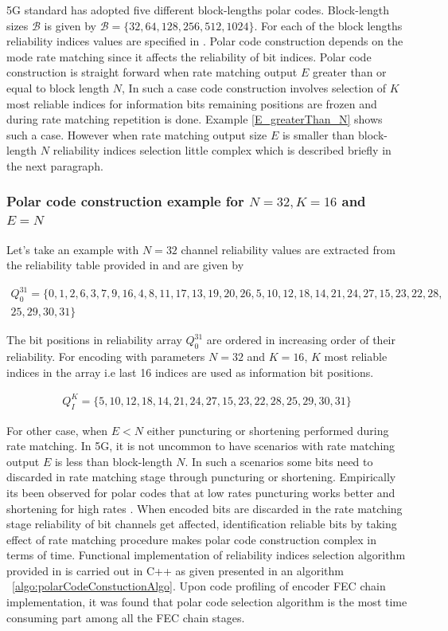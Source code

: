 5G standard has adopted five different block-lengths polar codes. Block-length sizes $\mathcal{B}$ is given by $\mathcal{B} = \{32,64,128,256,512,1024\}$.
For each of the block lengths reliability indices values are specified in \cite{3gpp.38.212}. Polar code construction depends on the mode rate matching since it affects the reliability of bit indices. Polar code construction is straight forward when rate matching output $E$ greater than or equal to block length $N$, In such a case code construction involves selection of $K$ most reliable indices for information bits remaining positions are frozen and during rate matching repetition is done. Example  \ref{E_greaterThan_N} shows such a case. However when rate matching output size $E$ is smaller than block-length $N$ reliability indices selection little complex which is described briefly in the next paragraph.

\subsubsection*{Polar code construction example for $N = 32, K = 16$ and $E = N$} \label{E_greaterThan_N}
Let's take an example with $N = 32$ channel reliability values are extracted from the reliability table provided in \cite{3gpp.38.212} and are given by

\begin{eqnarray*}
Q_{0}^{31} = \{ 0, 1, 2, 6, 3, 7, 9, 16,4, 8, 11, 17, 13, 19, 20, 26, 5, 10, 12, 18, 14, 21, 24, 27, 15, 23, 22, 28,\\
25, 29, 30, 31 \}
\end{eqnarray*}

The bit positions in reliability array $Q_{0}^{31}$ are ordered in increasing order of their reliability. For encoding with parameters $N = 32$ and $K = 16$, $K$ most reliable indices in the array i.e last 16 indices are used as information bit positions. 

\begin{eqnarray*}
	Q_{\textit{I}}^{\textit{K}} =  \{5, 10, 12, 18, 14, 21, 24, 27, 15, 23, 22, 28,25, 29, 30, 31 \}
\end{eqnarray*} 

For other case, when $E < N$ either puncturing or shortening performed during rate matching. In 5G, it is not uncommon to have scenarios with rate matching output $E$ is less than block-length $N$. In such a scenarios some bits need to discarded in rate matching stage through puncturing or shortening. Empirically its been observed for polar codes that at low rates puncturing works better and shortening for high rates \cite{lowcomplexityPuncShorteng}. When encoded bits are discarded in the rate matching stage reliability of bit channels get affected, identification reliable bits by taking effect of rate matching procedure makes polar code construction complex in terms of time. Functional implementation of reliability indices selection algorithm provided in \cite{3gpp.38.212} is carried out in C++ as given presented in an algorithm ~\ref{algo:polarCodeConstuctionAlgo}. Upon code profiling of encoder FEC chain implementation, it was found that polar code selection algorithm is the most time consuming part among all the FEC chain stages.

